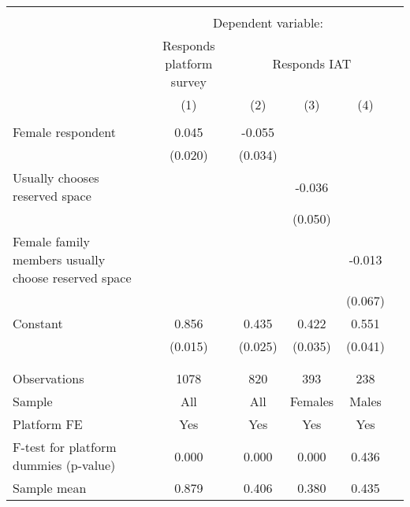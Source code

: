 \begin{tabular}{l*{5}{c}} \hline\hline \\[-1.8ex] & \multicolumn{4}{c}{Dependent variable:} \\ & \multicolumn{1}{c}{Responds platform survey} & \multicolumn{3}{c}{Responds IAT} \\ \cmidrule(lr){2-2}\cmidrule(lr){3-5}
                    &\multicolumn{1}{c}{(1)}         &\multicolumn{1}{c}{(2)}         &\multicolumn{1}{c}{(3)}         &\multicolumn{1}{c}{(4)}         \\
\hline \\[-1.8ex]
Female respondent   &       0.045\sym{**} &      -0.055         &                     &                     \\
                    &     (0.020)         &     (0.034)         &                     &                     \\
[1em]
Usually chooses reserved space&                     &                     &      -0.036         &                     \\
                    &                     &                     &     (0.050)         &                     \\
[1em]
Female family members usually choose reserved space&                     &                     &                     &      -0.013         \\
                    &                     &                     &                     &     (0.067)         \\
[1em]
Constant            &       0.856\sym{***}&       0.435\sym{***}&       0.422\sym{***}&       0.551\sym{***}\\
                    &     (0.015)         &     (0.025)         &     (0.035)         &     (0.041)         \\
\\[-1.8ex] \hline \\[-1.8ex]
Observations        &        1078         &         820         &         393         &         238         \\
Sample              &         All         &         All         &     Females         &       Males         \\
Platform FE         &         Yes         &         Yes         &         Yes         &         Yes         \\
F-test for platform dummies (p-value)&       0.000         &       0.000         &       0.000         &       0.436         \\
Sample mean         &       0.879         &       0.406         &       0.380         &       0.435         \\
\hline\hline \end{tabular}
